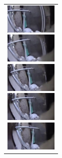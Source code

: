 \begin{enumerate}
\begin{end}
\begin{figure}[H]
    \begin{tabular}{l}
      \begin{minipage}{0.165\hsize}
        \begin{center}
          \includegraphics[clip, width=2.5cm]{./Figures/still_bark1.eps}
        \end{center}
      \end{minipage}
      \begin{minipage}{0.165\hsize}
        \begin{center}
          \includegraphics[clip, width=2.5cm]{./Figures/still_bark2.eps}
        \end{center}
      \end{minipage}
      \begin{minipage}{0.165\hsize}
        \begin{center}
          \includegraphics[clip, width=2.5cm]{./Figures/still_bark3.eps}
        \end{center}
      \end{minipage}
      \begin{minipage}{0.165\hsize}
        \begin{center}
          \includegraphics[clip, width=2.5cm]{./Figures/still_bark4.eps}
        \end{center}
      \end{minipage}
      \begin{minipage}{0.165\hsize}
        \begin{center}
          \includegraphics[clip, width=2.5cm]{./Figures/still_bark5.eps}

\end{center}
\end{minipage}
\end{tabular}
\end{figure}
\end{end}
\end{enumerate}
